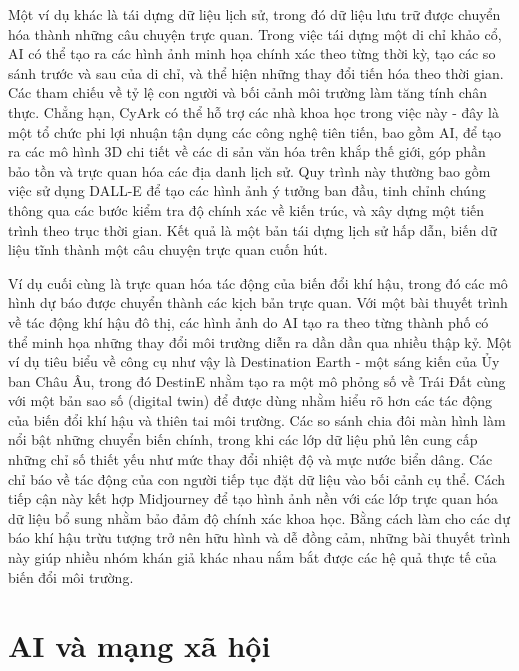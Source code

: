 Một ví dụ khác là tái dựng dữ liệu lịch sử, trong đó dữ liệu lưu trữ được chuyển hóa thành những câu chuyện trực quan. Trong việc tái dựng một di chỉ khảo cổ, AI có thể tạo ra các hình ảnh minh họa chính xác theo từng thời kỳ, tạo các so sánh trước và sau của di chỉ, và thể hiện những thay đổi tiến hóa theo thời gian. Các tham chiếu về tỷ lệ con người và bối cảnh môi trường làm tăng tính chân thực. Chẳng hạn, CyArk có thể hỗ trợ các nhà khoa học trong việc này - đây là một tổ chức phi lợi nhuận tận dụng các công nghệ tiên tiến, bao gồm AI, để tạo ra các mô hình 3D chi tiết về các di sản văn hóa trên khắp thế giới, góp phần bảo tồn và trực quan hóa các địa danh lịch sử. Quy trình này thường bao gồm việc sử dụng DALL-E để tạo các hình ảnh ý tưởng ban đầu, tinh chỉnh chúng thông qua các bước kiểm tra độ chính xác về kiến trúc, và xây dựng một tiến trình theo trục thời gian. Kết quả là một bản tái dựng lịch sử hấp dẫn, biến dữ liệu tĩnh thành một câu chuyện trực quan cuốn hút.

Ví dụ cuối cùng là trực quan hóa tác động của biến đổi khí hậu, trong đó các mô hình dự báo được chuyển thành các kịch bản trực quan. Với một bài thuyết trình về tác động khí hậu đô thị, các hình ảnh do AI tạo ra theo từng thành phố có thể minh họa những thay đổi môi trường diễn ra dần dần qua nhiều thập kỷ. Một ví dụ tiêu biểu về công cụ như vậy là Destination Earth - một sáng kiến của Ủy ban Châu Âu, trong đó DestinE nhằm tạo ra một mô phỏng số về Trái Đất cùng với một bản sao số (digital twin) để được dùng nhằm hiểu rõ hơn các tác động của biến đổi khí hậu và thiên tai môi trường. Các so sánh chia đôi màn hình làm nổi bật những chuyển biến chính, trong khi các lớp dữ liệu phủ lên cung cấp những chỉ số thiết yếu như mức thay đổi nhiệt độ và mực nước biển dâng. Các chỉ báo về tác động của con người tiếp tục đặt dữ liệu vào bối cảnh cụ thể. Cách tiếp cận này kết hợp Midjourney để tạo hình ảnh nền với các lớp trực quan hóa dữ liệu bổ sung nhằm bảo đảm độ chính xác khoa học. Bằng cách làm cho các dự báo khí hậu trừu tượng trở nên hữu hình và dễ đồng cảm, những bài thuyết trình này giúp nhiều nhóm khán giả khác nhau nắm bắt được các hệ quả thực tế của biến đổi môi trường.

\section{AI và mạng xã hội}

